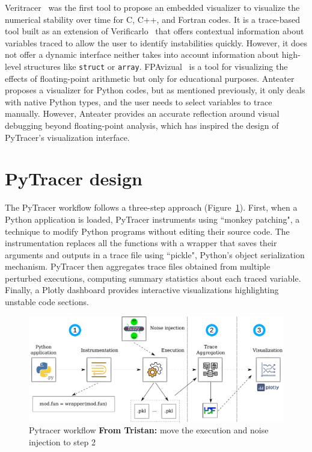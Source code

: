\documentclass[11pt]{article}
\newcommand{\tristan}[1]{\color{orange}\textbf{From Tristan:} #1\color{black}\xspace}
\newcommand{\pytracer}[0]{PyTracer\xspace}
\begin{document}
Veritracer~\cite{chatelain2018veritracer} was the first tool to propose an embedded visualizer to visualize the numerical stability over time for C, C++, and Fortran codes. It is a trace-based tool built as an extension of Verificarlo~\cite{verificarlo} that offers contextual information about variables traced to allow the user to identify instabilities quickly.
However, it does not offer a dynamic interface neither takes into account information about high-level structures like \texttt{struct} or \texttt{array}.
FPAvizual~\cite{gu2014fpavisual} is a tool for visualizing the effects of floating-point arithmetic but only for educational purposes.
Anteater~\cite{faust2019anteater} proposes a visualizer for Python codes, but as mentioned previously, it only deals with native Python types, and the user needs to select variables to trace manually. However, Anteater provides an accurate reflection around visual debugging beyond floating-point analysis, which has inspired the design of \pytracer's visualization interface.


\section{\pytracer design}


The PyTracer workflow follows a three-step approach (Figure~\ref{fig:workflow}). First, when a Python application is loaded, \pytracer instruments using ``monkey patching", a technique to modify Python programs without editing their source code. The instrumentation replaces all the functions with a wrapper that saves their arguments and outputs in a trace file using ``pickle", Python's object serialization mechanism. \pytracer then aggregates trace files obtained from multiple perturbed executions, computing summary statistics about each traced variable. Finally, a Plotly dashboard provides interactive visualizations highlighting unstable code sections.


\begin{figure}
    \centering
    \includegraphics[width=\linewidth]{figure/workflow.pdf}
    \caption{Pytracer workflow \tristan{move the execution and noise injection to step 2}}
    \label{fig:workflow}
\end{figure}
\end{document}
